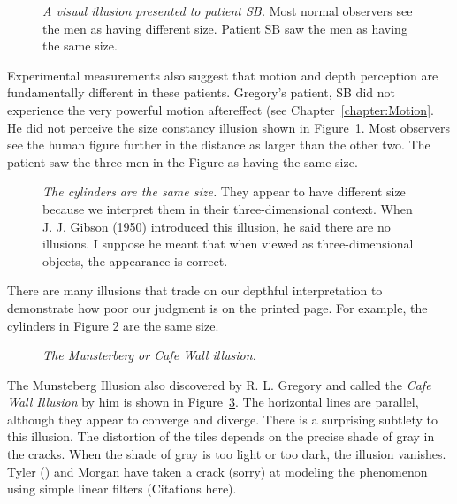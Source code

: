 \begin{figure}
\centerline{
}
\caption[Size Illusion]{
{\em A visual illusion presented to patient SB.}  Most normal
observers see the men as having different size.  Patient SB saw the
men as having the same size.  }
\label{f9:sizeSB}
\end{figure}
Experimental measurements also suggest that motion and depth
perception are fundamentally different in these patients.  Gregory's
patient, SB did not experience the very powerful motion aftereffect
(see Chapter~\ref{chapter:Motion}.  He did not perceive the size
constancy illusion shown in Figure~\ref{f9:sizeSB}.  Most observers
see the human figure further in the distance as larger than the other
two.  The patient saw the three men in the Figure as having the same
size.


\begin{figure}
\centerline{
}
\caption[Cylinders in perspective]{
{\em The cylinders are the same size.}  They appear to have different
size because we interpret them in their three-dimensional context.
When J. J. Gibson (1950) introduced this illusion, he said there are
no illusions.  I suppose he meant that when viewed as
three-dimensional objects, the appearance is correct.  }
\label{f10:cylinders}
\end{figure}
There are many illusions that trade on our depthful interpretation to
demonstrate how poor our judgment is on the printed page.  For
example, the cylinders in Figure \ref{f10:cylinders} are the same
size.

\begin{figure}
\centerline{
}
\caption[Cafe Wall Illusion]{
{\em The Munsterberg or Cafe Wall illusion.}
}
\label{f10:cafeWall}
\end{figure}
The Munsteberg Illusion also discovered by R. L. Gregory and called
the {\em Cafe Wall Illusion} by him is shown in
Figure~\ref{f10:cafeWall}.  The horizontal lines are parallel,
although they appear to converge and diverge.  There is a surprising
subtlety to this illusion.  The distortion of the tiles depends on the
precise shade of gray in the cracks.  When the shade of gray is too
light or too dark, the illusion vanishes.  Tyler () and Morgan have
taken a crack (sorry) at modeling the phenomenon using simple linear
filters (Citations here).

